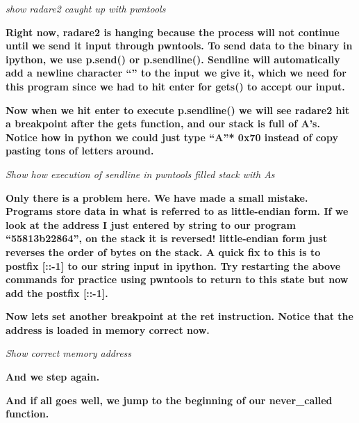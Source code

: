   
 

\textit{show radare2 caught up with pwntools}

\textbf{Right now, radare2 is hanging because the process will not continue until we send it input through pwntools. To
send data to the binary in ipython, we use p.send() or p.sendline(). Sendline will automatically add a newline
character ``'' to the input we give it, which we need for this program since we had to hit enter for gets() to accept
our input.}\newline
  
 

\textbf{Now when we hit enter to execute p.sendline() we will see radare2 hit a breakpoint after the gets function, and
our stack is full of A's. Notice how in python we could just type ``A''* 0x70 instead of copy pasting tons of letters
around.}

  
 

\textit{Show how execution of sendline in pwntools filled stack with As}

\textbf{Only there is a problem here. We have made a small mistake. Programs store data in what is referred to as
little-endian form. If we look at the address I just entered by string to our program ``55813b22864'', on the stack it
is reversed! little-endian form just reverses the order of bytes on the stack. A quick fix to this is to postfix [::-1]
to our string input in ipython. Try restarting the above commands for practice using pwntools to return to this state
but now add the postfix [::-1].}

  
 

\textbf{Now lets set another breakpoint at the ret instruction. Notice that the address is loaded in memory correct
now.}

  
 

\textit{Show correct memory address}

\textbf{And we step again.}

  
 

\textbf{And if all goes well, we jump to the beginning of our never\_called function.}

